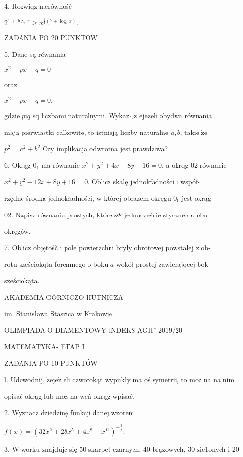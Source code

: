 \documentclass[a4paper,12pt]{article}
\begin{document}
4. Rozwiqz nierównośč

$2^{1+\log_{2}x}\geq x^{\frac{1}{4}(7+\log_{2}x)}.$

ZADANIA PO 20 PUNKTÓW

5. Dane są równania

$x^{2}-px+q=0$

oraz

$x^{2}-px-q=0,$

gdzie $p\mathrm{i}q$ sq liczbami naturalnymi. Wykaz$\cdot, \dot{\mathrm{z}}$ ejezeli obydwa równania

mają pierwiastki calkowite, to istnieją liczby naturalne $a, b$, takie $\dot{\mathrm{z}}\mathrm{e}$

$p^{2}=a^{2}+b^{2}$ Czy implikacja odwrotna jest prawdziwa?

6. Okrąg $0_{1}$ ma równanie $x^{2}+y^{2}+4x-8y+16=0$, a okrqg 02 równanie

$x^{2}+y^{2}-12x+8y+16 = 0$. Oblicz skalę jednokfadności i wspóf-

rzędne środka jednokładności, w której obrazem okręgu $0_{1}$ jest okrąg

02. Napisz równania prostych, które $\mathrm{s}\Phi$ jednocześnie styczne do obu

okręgów.

7. Oblicz objętośč i pole powierzchni bryly obrotowej powstalej z ob-

rotu sześciokqta foremnego o boku $a$ wokół prostej zawierajqcej bok

sześciokąta.






AKADEMIA GÓRNICZO-HUTNICZA

im. Stanisława Staszica w Krakowie

OLIMPIADA O DIAMENTOWY INDEKS AGH'' 2019/20

MATEMATYKA- ETAP I

ZADANIA PO 10 PUNKTÓW

l. Udowodnij, $\dot{\mathrm{z}}\mathrm{e}\mathrm{j}\mathrm{e}\dot{\mathrm{z}}$ eli czworokąt wypukły ma oś symetrii, to $\mathrm{m}\mathrm{o}\dot{\mathrm{z}}$ na na nim

opisač okrąg lub $\mathrm{m}\mathrm{o}\dot{\mathrm{z}}$ na weń okrąg wpisač.

2. Wyznacz dziedzinę funkcji danej wzorem

$f(x)=(32x^{2}+28x^{5}+4x^{8}-x^{11})^{-\frac{3}{4}}.$

3. $\mathrm{W}$ worku znajduje się 50 skarpet czarnych, 40 brązowych, 30 zie1onych i 20
\end{document}
